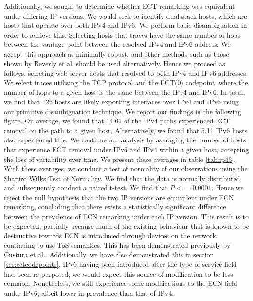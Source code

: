 \documentclass{l4proj}
\begin{document}
Additionally, we sought to determine whether ECT remarking was equivalent under differing IP versions. We would seek to identify dual-stack hosts, which are hosts that operate over both IPv4 and IPv6. We perform basic disambiguation in order to achieve this. Selecting hosts that traces have the same number of hops between the vantage point between the resolved IPv4 and IPv6 address. We accept this approach as minimally robust, and other methods such as those shown by Beverly et al.\cite{mirkovic_server_2015} should be used alternatively. Hence we proceed as follows, selecting web server hosts that resolved to both IPv4 and IPv6 addresses. We select traces utilising the TCP protocol and the ECT(0) codepoint, where the number of hops to a given host is the same between the IPv4 and IPv6. In total, we find that 126 hosts are likely exporting interfaces over IPv4 and IPv6 using our primitive disambiguation technique. We report our findings in the following figure. On average, we found that 14.61 of the IPv4 paths experienced ECT removal on the path to a given host. Alternatively, we found that 5.11 IPv6 hosts also experienced this. We continue our analysis by averaging the number of hosts that experience ECT removal under IPv6 and IPv4 within a given host, accepting the loss of variability over time. We present these averages in table \ref{tab:ip46}. With these averages, we conduct a test of normality of our observations using the Shapiro Wilks Test of Normality. We find that the data is normally distributed and subsequently conduct a paired t-test. We find that $ P<=0.0001 $. Hence we reject the null hypothesis that the two IP versions are equivalent under ECN remarking, concluding that there exists a statistically significant difference between the prevalence of ECN remarking under each IP version. This result is to be expected, partially because much of the existing behaviour that is known to be destructive towards ECN is introduced through devices on the network continuing to use ToS semantics. This has been demonstrated previously by Custura et al.\cite{custura_exploring_2018}. Additionally, we have also demonstrated this in section \ref{sec:ectcodepoints}. IPv6 having been introduced after the type of service field had been re-purposed, we would expect this source of modification to be less common. Nonetheless, we still experience some modifications to the ECN field under IPv6, albeit lower in prevalence than that of IPv4.
\end{document}
